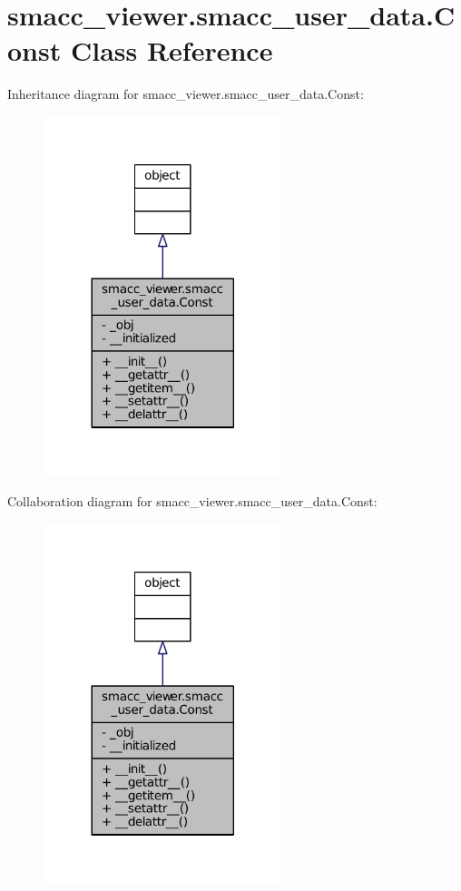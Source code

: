 \hypertarget{classsmacc__viewer_1_1smacc__user__data_1_1Const}{}\section{smacc\+\_\+viewer.\+smacc\+\_\+user\+\_\+data.\+Const Class Reference}
\label{classsmacc__viewer_1_1smacc__user__data_1_1Const}


Inheritance diagram for smacc\+\_\+viewer.\+smacc\+\_\+user\+\_\+data.\+Const\+:
\nopagebreak
\begin{figure}[H]
\begin{center}
\leavevmode
\includegraphics[width=197pt]{classsmacc__viewer_1_1smacc__user__data_1_1Const__inherit__graph}
\end{center}
\end{figure}


Collaboration diagram for smacc\+\_\+viewer.\+smacc\+\_\+user\+\_\+data.\+Const\+:
\nopagebreak
\begin{figure}[H]
\begin{center}
\leavevmode
\includegraphics[width=197pt]{classsmacc__viewer_1_1smacc__user__data_1_1Const__coll__graph}
\end{center}
\end{figure}
